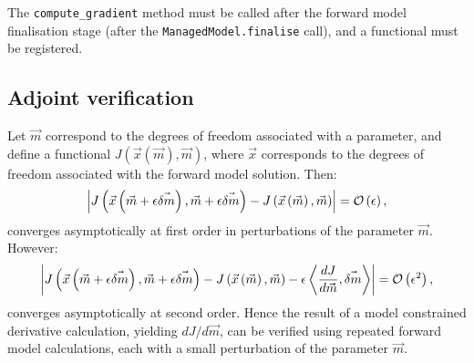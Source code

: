 \documentclass[a4paper]{book}
\begin{document}
The \verb+compute_gradient+ method must be called after the forward model
finalisation stage (after the \verb+ManagedModel.finalise+ call), and a
functional must be registered.

\subsection{Adjoint verification}

Let $\vec{m}$ correspond to the degrees of freedom associated with a parameter,
and define a functional
$J \left( \vec{x} \left( \vec{m} \right), \vec{m} \right)$, where $\vec{x}$
corresponds to the degrees of freedom associated with the forward model solution.
Then:
\begin{equation}
  \left| J \left( \vec{x} \left( \vec{m} + \epsilon \vec{\delta m} \right), \vec{m} + \epsilon \vec{\delta m} \right)
    - J \left( \vec{x} \left( \vec{m} \right), \vec{m} \right) \right|
    = {\cal O} \left( \epsilon \right),
\end{equation}
converges asymptotically at first order in perturbations of the parameter
$\vec{m}$. However:
\begin{equation}
  \left| J \left( \vec{x} \left( \vec{m} + \epsilon \vec{\delta m} \right), \vec{m} + \epsilon \vec{\delta m} \right)
    - J \left( \vec{x} \left( \vec{m} \right), \vec{m} \right)
    - \epsilon \left< \frac{d J}{d \vec{m}}, \vec{\delta m} \right> \right|
    = {\cal O} \left( \epsilon^2 \right),
\end{equation}
converges asymptotically at second order. Hence the result of a model
constrained derivative calculation, yielding $d J / d \vec{m}$, can be verified
using repeated forward model calculations, each with a small perturbation of the
parameter $\vec{m}$.
\end{document}
